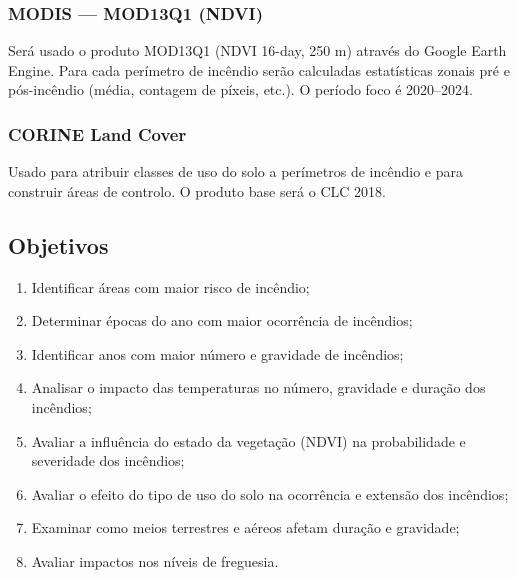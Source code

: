 \subsubsection{MODIS — MOD13Q1 (NDVI)}
Será usado o produto MOD13Q1 (NDVI 16-day, 250 m) através do Google Earth Engine. Para cada perímetro de incêndio serão calculadas estatísticas zonais pré e pós-incêndio (média, contagem de píxeis, etc.). O período foco é 2020–2024.

\subsubsection{CORINE Land Cover}
Usado para atribuir classes de uso do solo a perímetros de incêndio e para construir áreas de controlo. O produto base será o CLC 2018.

\subsection{Objetivos}
\begin{enumerate}
	\item Identificar áreas com maior risco de incêndio;
	\item Determinar épocas do ano com maior ocorrência de incêndios;
	\item Identificar anos com maior número e gravidade de incêndios;
	\item Analisar o impacto das temperaturas no número, gravidade e duração dos incêndios;
	\item Avaliar a influência do estado da vegetação (NDVI) na probabilidade e severidade dos incêndios;
	\item Avaliar o efeito do tipo de uso do solo na ocorrência e extensão dos incêndios;
	\item Examinar como meios terrestres e aéreos afetam duração e gravidade;
	\item Avaliar impactos nos níveis de freguesia.
\end{enumerate}

